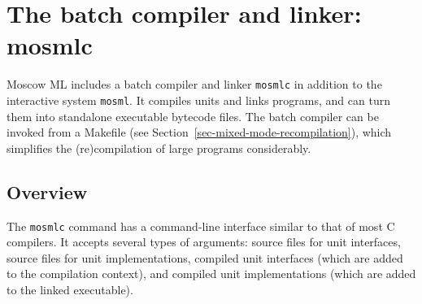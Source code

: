 \documentclass[fleqn,a4paper]{article}
\begin{document}

  
  

  

\newpage

\section{The batch compiler and linker: mosmlc}
\label{sec-batch-compiler}

Moscow ML includes a batch compiler and linker {\tt mosmlc} in
addition to the interactive system {\tt mosml}.  It compiles units and
links programs, and can turn them into standalone executable bytecode
files.  The batch compiler can be invoked from a Makefile (see
Section~\ref{sec-mixed-mode-recompilation}),
which simplifies the
(re)compilation of large programs considerably.


\subsection{Overview}

The {\tt mosmlc} command has a command-line interface similar to that
of most C compilers.  It accepts several types of arguments: source
files for unit interfaces, source files for unit implementations,
compiled unit interfaces (which are added to the compilation context),
and compiled unit implementations (which are added to the linked
executable).
\end{document}
